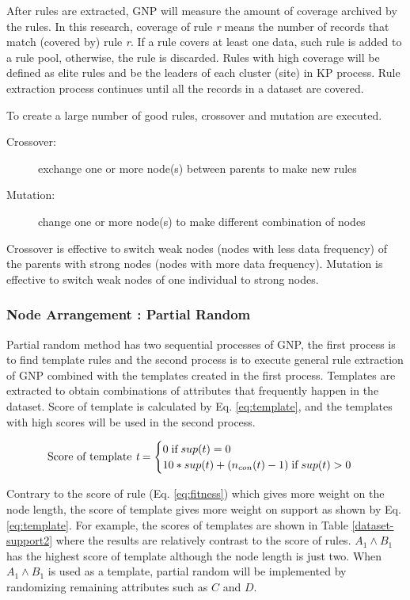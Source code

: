 \documentclass{elsart}
\begin{document}
After rules are extracted, GNP will measure the amount of coverage archived by the rules. In this research, coverage of rule {\it r} means the number of records that match (covered by) rule {\it r}. If a rule covers at least one data, such rule is added to a rule pool, otherwise, the rule is discarded. Rules with high coverage will be defined as elite rules and be the leaders of each cluster (site) in KP process.
Rule extraction process continues until all the records in a dataset are covered.

To create a large number of good rules, crossover and mutation are executed.
\begin{description}
\item [Crossover:] exchange one or more node(s) between parents to make new rules
\item [Mutation:] change one or more node(s) to make different combination of nodes
\end{description}
Crossover is effective to switch weak nodes (nodes with less data frequency) of the parents with strong nodes (nodes with more data frequency). Mutation is effective to switch weak nodes of one individual to strong nodes.

\subsubsection{Node Arrangement : Partial Random \label{sec:partial-random}}
Partial random method has two sequential processes of GNP, the first process is to find template rules and the second process is to execute general rule extraction of GNP combined with the templates created in the first process. Templates are extracted to obtain combinations of attributes that frequently happen in the dataset. Score of template is calculated by Eq. \ref{eq:template}, and the templates with high scores will be used in the second process.

\begin{eqnarray}
\begin{array}{lll}
\text{Score of template \it{t}}=\begin{cases} 0 \;\text{if}\; sup(t)=0 & \\ 10*sup(t)+(n_{con}(t)-1) \;\text{if}\; sup(t)>0 \end{cases}
\end{array}
\label{eq:template}
\end{eqnarray}

Contrary to the score of rule (Eq. \ref{eq:fitness}) which gives more weight on the node length, the score of template gives more weight on support as shown by Eq. \ref{eq:template}. For example, the scores of templates are shown in Table \ref{dataset-support2} where the results are relatively contrast to the score of rules. $A_{1}\wedge B_{1}$ has the highest score of template although the node length is just two. When $A_{1}\wedge B_{1}$ is used as a template, partial random will be implemented by randomizing remaining attributes such as $C$ and $D$.
\end{document}
